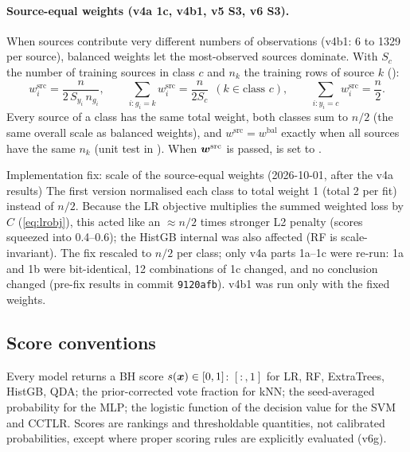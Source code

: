 \paragraph{Source-equal weights (v4a 1c, v4b1, v5 S3, v6 S3).} When sources contribute very different numbers of
observations (v4b1: 6 to 1329 per source), balanced weights let the most-observed sources dominate. With $S_c$ the number
of training sources in class $c$ and $n_k$ the training rows of source $k$ ():
\begin{equation}
w^{\mathrm{src}}_i = \frac{n}{2\,S_{y_i}\,n_{g_i}},\qquad \sum_{i:g_i=k} w^{\mathrm{src}}_i = \frac{n}{2S_{c}}\ \ (k\in\text{class }c),\qquad
\sum_{i:y_i=c}w^{\mathrm{src}}_i=\frac n2 .\label{eq:sourceequal}
\end{equation}
Every source of a class has the same total weight, both classes sum to $n/2$ (the same overall scale as balanced weights),
and $w^{\mathrm{src}}=w^{\mathrm{bal}}$ exactly when all sources have the same $n_k$ (unit test in ).
When $\bm{w}^{\mathrm{src}}$ is passed,  is set to .

\begin{cautionbox}{Implementation fix: scale of the source-equal weights (2026-10-01, after the v4a results)}
The first version normalised each class to total weight 1 (total 2 per fit) instead of $n/2$. Because the LR objective
multiplies the summed weighted loss by $C$ (\cref{eq:lrobj}), this acted like an $\approx n/2$ times stronger L2 penalty
(scores squeezed into 0.4--0.6); the HistGB internal  was also affected (RF is scale-invariant).
The fix rescaled to $n/2$ per class; only v4a parts 1a--1c were re-run: 1a and 1b were bit-identical, 12 combinations of 1c
changed, and no conclusion changed (pre-fix results in commit \texttt{9120afb}). v4b1 was run only with the fixed weights.
\end{cautionbox}

\subsection{Score conventions}
Every model returns a BH score $s(\bm{x})\in[0,1]$: $[:,1]$ for LR, RF, ExtraTrees, HistGB, QDA;
the prior-corrected vote fraction for kNN; the seed-averaged probability for the MLP; the logistic function of the
decision value for the SVM and CCTLR. Scores are rankings and thresholdable quantities, not calibrated probabilities,
except where proper scoring rules are explicitly evaluated (v6g).

